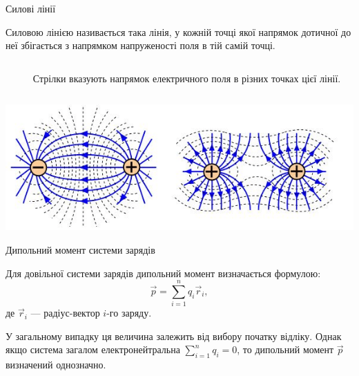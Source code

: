 \documentclass{beamer}
\begin{document}
\begin{frame}{Силові лінії}{}
	\begin{block}{}
		\alert{Силовою лінією} називається така лінія, у кожній точці якої
		напрямок дотичної до неї збігається з напрямком напруженості поля в тій
		самій точці.
	\end{block}
	\begin{columns}
		\begin{column}{0.45\linewidth}
			\begin{center}
				
			\end{center}
		\end{column}
		\begin{column}{0.45\linewidth}
			\begin{block}{}
				Стрілки вказують напрямок електричного поля в різних
				точках цієї лінії.
			\end{block}
		\end{column}
	\end{columns}
	\begin{center}
		\includegraphics[width=1\linewidth]{fieldlines}
	\end{center}
\end{frame}

\begin{frame}{Дипольний момент системи зарядів}{}
  	\begin{block}{}\justifying
		Для довільної системи зарядів дипольний момент визначається формулою:
		\begin{equation*}
			\vec{p} = \sum_{i=1}^{n}q_i\vec{r}_i,
		\end{equation*}
		де $\vec{r}_i$ --- радіус-вектор $i$-го заряду.

	\end{block}
    \begin{center}
    
    \end{center}
   	\begin{exampleblock}{}\justifying\small
		У загальному випадку ця
		величина залежить від вибору початку відліку. Однак якщо система
		загалом електронейтральна $\sum_{i=1}^{n} q_i = 0$, то
		дипольний момент $\vec{p}$ визначений однозначно.
	\end{exampleblock}
\end{frame}
\end{document}

